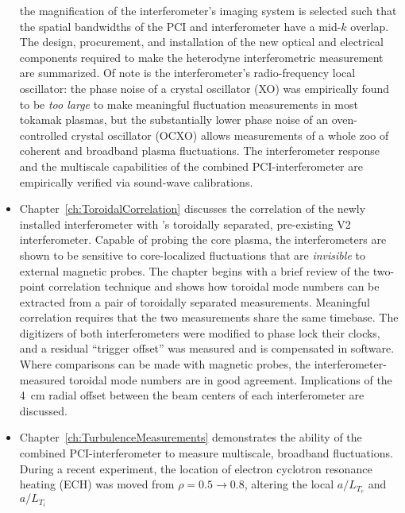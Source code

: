\begin{itemize}
    the magnification of the interferometer's imaging system
    is selected such that the spatial bandwidths
    of the PCI and interferometer have a mid-$k$ overlap.
    The design, procurement, and installation
    of the new optical and electrical components
    required to make the heterodyne interferometric measurement
    are summarized.
    Of note is the interferometer's radio-frequency local oscillator:
    the phase noise of a crystal oscillator (XO)
    was empirically found to be \emph{too large}
    to make meaningful fluctuation measurements in most tokamak plasmas, but
    the substantially lower phase noise of an
    oven-controlled crystal oscillator (OCXO)
    allows measurements of a whole zoo
    of coherent and broadband plasma fluctuations.
    The interferometer response and
    the multiscale capabilities of the combined PCI-interferometer
    are empirically verified via sound-wave calibrations.
  \item Chapter~\ref{ch:ToroidalCorrelation} discusses the correlation
    of the newly installed interferometer with
    \diiid's toroidally separated, pre-existing V2 interferometer.
    Capable of probing the core plasma,
    the interferometers are shown to be sensitive
    to core-localized fluctuations
    that are \emph{invisible} to external magnetic probes.
    The chapter begins with a brief review
    of the two-point correlation technique and
    shows how toroidal mode numbers can be extracted
    from a pair of toroidally separated measurements.
    Meaningful correlation requires that
    the two measurements share the same timebase.
    The digitizers of both interferometers were modified
    to phase lock their clocks, and
    a residual ``trigger offset'' was measured
    and is compensated in software.
    Where comparisons can be made with magnetic probes,
    the interferometer-measured toroidal mode numbers
    are in good agreement.
    Implications of the \SI{4}{\centi\meter} radial offset
    between the beam centers of each interferometer are discussed.
  \item Chapter~\ref{ch:TurbulenceMeasurements} demonstrates
    the ability of the combined PCI-interferometer
    to measure multiscale, broadband fluctuations.
    During a recent \diiid\space experiment,
    the location of electron cyclotron resonance heating (ECH)
    was moved from $\rho = 0.5 \rightarrow 0.8$,
    altering the local $a / L_{T_e}$ and $a / L_{T_i}$

\end{itemize}
